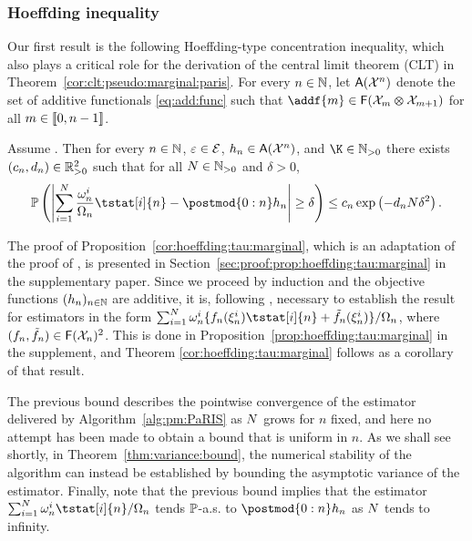 
\subsubsection*{Hoeffding inequality}

Our first result is the following Hoeffding-type concentration inequality, which also plays a critical role for the derivation of the central limit theorem (CLT) in Theorem~\ref{cor:clt:pseudo:marginal:paris}. For every $n \in \mathbb{N}$, let $\mathsf{A}(\mathcal{X}^n)$ denote the set of additive functionals \eqref{eq:add:func} such that $\addf{m} \in \bmf{\Xfd_m \tensprod \Xfd_{m + 1}}$ for all $m \in \llbracket 0, n - 1 \rrbracket$.   
\begin{theorem}
\label{cor:hoeffding:tau:marginal}
Assume . Then for every $n \in \mathbb{N}$, $\varepsilon \in \mathcal{E}$, $h_n \in \mathsf{A}(\mathcal{X}^n)$, and $\K \in \nsetpos$ there exists $(c_n, d_n) \in \mathbb{R}_{> 0}^2$ such that for all $N \in \mathbb{N}_{> 0}$ and $\delta > 0$,
$$
\pP\left(\left| \sum_{i = 1}^\N \frac{\ewght{n}{i}}{\sumwght{n}} \tstat[i]{n} - \postmod{0:n} h_n \right| \geq \delta \right) \leq c_n \exp \left( - d_n \N \delta^2 \right).
$$
\end{theorem}

The proof of Proposition~\ref{cor:hoeffding:tau:marginal}, which is an adaptation of the proof of \cite[Theorem~1]{olsson:westerborn:2014b}, is presented in Section~\ref{sec:proof:prop:hoeffding:tau:marginal} in the supplementary paper. Since we proceed by induction and the objective functions $(h_n)_{n \in \mathbb{N}}$ are additive, it is, following \cite{olsson:westerborn:2014b}, necessary to establish the result for estimators in the form $\sum_{i = 1}^\N \ewght{n}{i} \{ f_n(\epart{n}{i}) \tstat[i]{n} + \ftd{n}(\epart{n}{i}) \} / \sumwght{n}$, where $(f_n, \tilde{f}_{n}) \in \mathsf{F}(\mathcal{X}_n)^2$. This is done in Proposition~\ref{prop:hoeffding:tau:marginal} in the supplement, and Theorem \ref{cor:hoeffding:tau:marginal} follows as a corollary of that result. 

The previous bound describes the pointwise convergence of the estimator delivered by Algorithm~\ref{alg:pm:PaRIS} as $N$ grows for $n$ fixed, and here no attempt has been made to obtain a bound that is uniform in $n$. As we shall see shortly, in Theorem~\ref{thm:variance:bound}, the numerical stability of the algorithm can instead be established by bounding the asymptotic variance of the estimator. Finally, note that the previous bound implies that the estimator $\sum_{i = 1}^\N \ewght{n}{i} \tstat[i]{n} / \sumwght{n}$ tends $\mathbb{P}$-a.s. to $\postmod{0:n} h_n$ as $N$ tends to infinity. 

